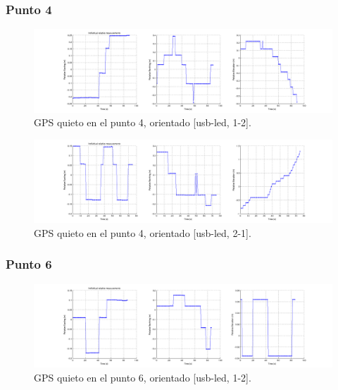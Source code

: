 \documentclass[spanish,12pt,a4paper,titlepage]{report}
\begin{document}
\newpage
\subsubsection*{Punto 4}
\label{sec:punto-4}

\begin{figure}[h!]
  \hspace{-70pt}
  \includegraphics[width=1.3\textwidth]{./img/log_08_individual.png}
  \caption{GPS quieto en el punto 4, orientado [usb-led, 1-2].}
  \label{fig:log_08_individual.png}
\end{figure}

\begin{figure}[h!]
  \hspace{-70pt}
  \includegraphics[width=1.3\textwidth]{./img/log_07_individual.png}
  \caption{GPS quieto en el punto 4, orientado [usb-led, 2-1].}
  \label{fig:log_07_individual.png}
\end{figure}

\subsubsection*{Punto 6}
\label{sec:punto-6}

\begin{figure}[h!]
  \hspace{-70pt}
  \includegraphics[width=1.3\textwidth]{./img/log_06_individual.png}
  \caption{GPS quieto en el punto 6, orientado [usb-led, 1-2].}
  \label{fig:log_06_individual.png}
\end{figure}
\end{document}
